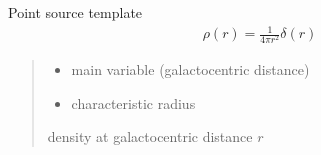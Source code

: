 \documentclass[letterpaper,10pt,english]{sphinxmanual}
\begin{document}
\begin{fulllineitems}
\label{\detokenize{diffsph.profiles:diffsph.profiles.templates.ps}}
\pysigstartsignatures
{}
\pysigstopsignatures
\sphinxAtStartPar
Point source template
\begin{equation*}
\begin{split}\rho(r) = \frac1{4\pi r^2}\delta(r)\end{split}
\end{equation*}\begin{quote}\begin{description}
\begin{itemize}
\item {} 
\sphinxAtStartPar
{} \textendash{} main variable (galactocentric distance)

\item {} 
\sphinxAtStartPar
{} \textendash{} characteristic radius

\end{itemize}

\sphinxAtStartPar
density at galactocentric distance \(r\)

\end{description}\end{quote}

\end{fulllineitems}

\end{document}
